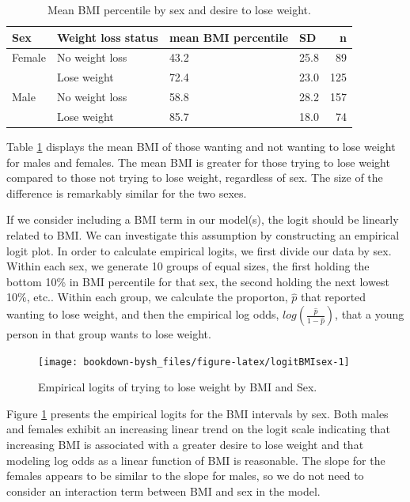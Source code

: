 \documentclass[
]{krantz}
\begin{document}
\begin{table}

\caption{\label{tab:table3chp6}Mean BMI percentile by sex and desire to lose weight.}
\centering
\begin{tabular}[t]{llllr}
\toprule
Sex & Weight loss status & mean BMI percentile & SD & n\\
\midrule
Female & No weight loss & 43.2 & 25.8 & 89\\
 & Lose weight & 72.4 & 23.0 & 125\\
Male & No weight loss & 58.8 & 28.2 & 157\\
 & Lose weight & 85.7 & 18.0 & 74\\
\bottomrule
\end{tabular}
\end{table}

Table \ref{tab:table3chp6} displays the mean BMI of those wanting and not wanting to lose weight for males and females. The mean BMI is greater for those trying to lose weight compared to those not trying to lose weight, regardless of sex. The size of the difference is remarkably similar for the two sexes.

If we consider including a BMI term in our model(s), the logit should be linearly related to BMI. We can investigate this assumption by constructing an empirical logit plot. In order to calculate empirical logits, we first divide our data by sex. Within each sex, we generate 10 groups of equal sizes, the first holding the bottom 10\% in BMI percentile for that sex, the second holding the next lowest 10\%, etc.. Within each group, we calculate the proporton, \(\hat{p}\) that reported wanting to lose weight, and then the empirical log odds, \(log(\frac{\hat{p}}{1-\hat{p}})\), that a young person in that group wants to lose weight.

\begin{figure}

{\centering \texttt{[image: bookdown-bysh\_files/figure-latex/logitBMIsex-1]} 

}

\caption{Empirical logits of trying to lose weight by BMI and Sex.}\label{fig:logitBMIsex}
\end{figure}

Figure \ref{fig:logitBMIsex} presents the empirical logits for the BMI intervals by sex. Both males and females exhibit an increasing linear trend on the logit scale indicating that increasing BMI is associated with a greater desire to lose weight and that modeling log odds as a linear function of BMI is reasonable. The slope for the females appears to be similar to the slope for males, so we do not need to consider an interaction term between BMI and sex in the model.
\end{document}
